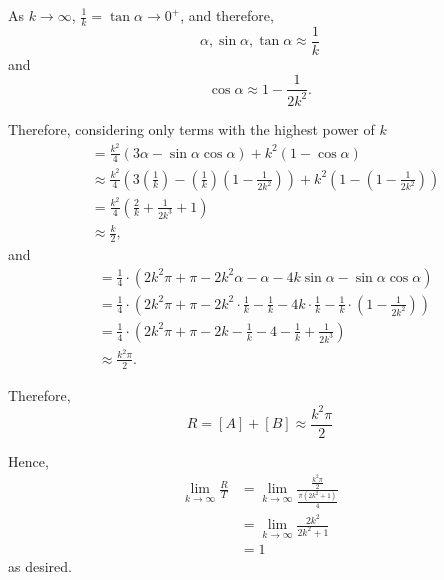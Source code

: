 \begin{enumerate}
          As \(k \to \infty\), \(\frac{1}{k} = \tan \alpha \to 0^{+}\), and therefore,
          \[
              \alpha, \sin \alpha, \tan \alpha \approx \frac{1}{k}
          \]
          and
          \[
              \cos \alpha \approx 1 - \frac{1}{2k^2}.
          \]

          Therefore, considering only terms with the highest power of \(k\)
          \begin{align*}
              [A] & = \frac{k^2}{4} \left(3 \alpha - \sin \alpha \cos \alpha\right) + k^2 \left(1 - \cos \alpha\right)                                                                              \\
                  & \approx \frac{k^2}{4} \left(3 \left(\frac{1}{k}\right) - \left(\frac{1}{k}\right) \left(1 - \frac{1}{2k^2}\right)\right) + k^2 \left(1 - \left(1 - \frac{1}{2k^2}\right)\right) \\
                  & = \frac{k^2}{4} \left(\frac{2}{k} + \frac{1}{2k^3} + 1\right)                                                                                                                   \\
                  & \approx \frac{k}{2},
          \end{align*}
          and
          \begin{align*}
              [B] & = \frac{1}{4} \cdot \left(2k^2 \pi + \pi - 2k^2 \alpha - \alpha - 4k \sin \alpha - \sin \alpha \cos \alpha\right)                                                 \\
                  & = \frac{1}{4} \cdot \left(2k^2 \pi + \pi - 2k^2 \cdot \frac{1}{k} - \frac{1}{k} - 4k \cdot \frac{1}{k} - \frac{1}{k} \cdot \left(1 - \frac{1}{2k^2}\right)\right) \\
                  & = \frac{1}{4} \cdot \left(2k^2 \pi + \pi - 2k - \frac{1}{k} - 4 - \frac{1}{k} + \frac{1}{2k^3}\right)                                                             \\
                  & \approx \frac{k^2 \pi}{2}.
          \end{align*}

          Therefore,
          \[
              R = [A] + [B] \approx \frac{k^2 \pi}{2}
          \]

          Hence,
          \begin{align*}
              \lim_{k \to \infty} \frac{R}{T} & = \lim_{k \to \infty} \frac{\frac{k^2 \pi}{2}}{\frac{\pi \left(2k^2 + 1\right)}{4}} \\
                                              & = \lim_{k \to \infty} \frac{2k^2}{2k^2 + 1}                                         \\
                                              & = 1
          \end{align*}
          as desired.


\end{enumerate}
